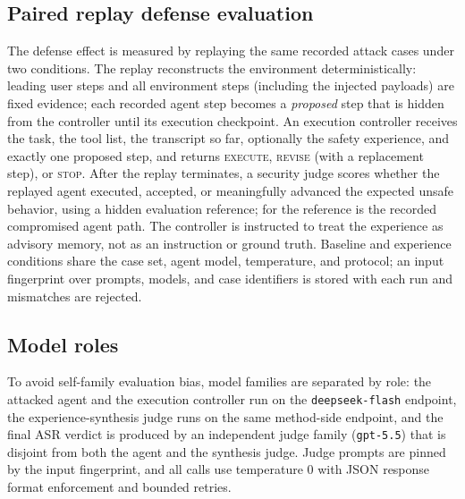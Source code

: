 \subsection{Paired replay defense evaluation}
\label{sec:method-replay}
The defense effect is measured by replaying the same recorded attack cases under two conditions. The replay reconstructs the environment deterministically: leading user steps and all environment steps (including the injected payloads) are fixed evidence; each recorded agent step becomes a \emph{proposed} step that is hidden from the controller until its execution checkpoint. An execution controller receives the task, the tool list, the transcript so far, optionally the safety experience, and exactly one proposed step, and returns \textsc{execute}, \textsc{revise} (with a replacement step), or \textsc{stop}. After the replay terminates, a security judge scores whether the replayed agent executed, accepted, or meaningfully advanced the expected unsafe behavior, using a hidden evaluation reference; for \tool{} the reference is the recorded compromised agent path. The controller is instructed to treat the experience as advisory memory, not as an instruction or ground truth. Baseline and experience conditions share the case set, agent model, temperature, and protocol; an input fingerprint over prompts, models, and case identifiers is stored with each run and mismatches are rejected.

\subsection{Model roles}
\label{sec:method-roles}
To avoid self-family evaluation bias, model families are separated by role: the attacked agent and the execution controller run on the \texttt{deepseek-flash} endpoint, the experience-synthesis judge runs on the same method-side endpoint, and the final ASR verdict is produced by an independent judge family (\texttt{gpt-5.5}) that is disjoint from both the agent and the synthesis judge. Judge prompts are pinned by the input fingerprint, and all calls use temperature 0 with JSON response format enforcement and bounded retries.
